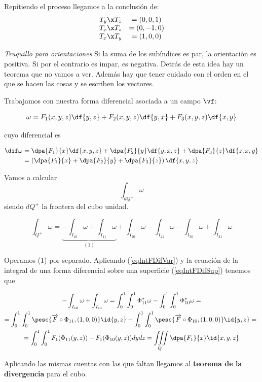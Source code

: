 Repitiendo el proceso llegamos a la conclusión de: \[
\begin{array}{cc}
T_y\x T_z &= (0,0,1)\\
T_x\x T_z &= (0,-1,0)\\
T_x\x T_y &= (1,0,0)
\end{array}\]

\textit{Truquillo para orientaciones} Si la suma de los subíndices es par, la orientación es positiva. Si por el contrario es impar, es negativa. Detrás de esta idea hay un teorema que no vamos a ver. Además hay que tener cuidado con el orden en el que se hacen las cosas y se escriben los vectores.

Trabajamos con nuestra forma diferencial asociada a un campo $\vf$:

\[\omega = F_1(x,y,z)\df{y,z}+F_2(x,y,z)\df{y,x}+F_3(x,y,z)\df{x,y}\]
 
cuyo diferencial es
 
\begin{align*}
\dif \omega &= \dpa{F_1}{x}\df{x,y,z} + \dpa{F_2}{y}\df{y,x,z} + \dpa{F_3}{z}\df{z,x,y} \\
	&= \left(\dpa{F_1}{x}+\dpa{F_2}{y} + \dpa{F_3}{z}\right) \df{x,y,z}
\end{align*}

Vamos a calcular \[\int_{dQ^+} \omega\] siendo $dQ^+$ la frontera del cubo unidad.

\[\int_{Q^+} \omega =\underbrace{ -\int_{I_{10}} \omega +  \int_{I_{11}} \omega}_{(1)} + \int_{I_{20}} \omega -  \int_{I_{21}} \omega  -\int_{I_{30}} \omega +  \int_{I_{31}} \omega\]

Operamos (1) por separado. Aplicando (\ref{eqIntFDifVar}) y la ecuación de la integral de una forma diferencial sobre una superficie (\ref{eqIntFDifSup}) tenemos que

\begin{gather*}
 -\int_{I_{10}} \omega +  \int_{I_{11}} \omega = \int_0^1\int_0^1\Phi^{\ast}_{11}\omega - \int_0^1\int_0^1 \Phi^{\ast}_{10} \omega = \\
 = \int_0^1\int_0^1 \pesc{\overrightarrow{F}\circ \Phi_{11},(1,0,0)}\id{y,z}
 -\int_0^1\int_0^1 \pesc{\overrightarrow{F}\circ \Phi_{10},(1,0,0)}\id{y,z}= \\ 
= \int_0^1\int_0^1 F_1(\Phi_{11}(y,z))-F_1(\Phi_{10}(y,z))dydz = \iiint\limits_Q \dpa{F_1}{x}\id{x,y,z}
\end{gather*}

Aplicando las mismas cuentas con las que faltan llegamos al \textbf{teorema de la divergencia} para el cubo. 


